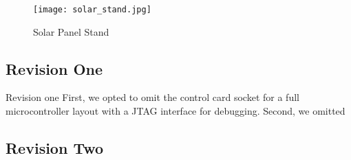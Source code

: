 \begin{figure}
\centering
\texttt{[image: solar\_stand.jpg]}
\caption{Solar Panel Stand}
\label{solar stand}
\end{figure}

\subsection{Revision One}
Revision one 
First, we opted to omit the control card socket for a full microcontroller layout with a JTAG interface for debugging. Second, we omitted 

\subsection{Revision Two}


